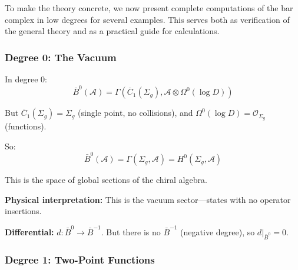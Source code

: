 To make the theory concrete, we now present complete computations of the bar complex in low degrees for several examples. This serves both as verification of the general theory and as a practical guide for calculations.

\subsubsection{Degree 0: The Vacuum}

\begin{computation}[Degree 0]\label{comp:deg0}
In degree 0:
$$\bar{B}^0(\mathcal{A}) = \Gamma\left(\overline{C}_1(\Sigma_g), \mathcal{A} \otimes \Omega^0(\log D)\right)$$

But $\overline{C}_1(\Sigma_g) = \Sigma_g$ (single point, no collisions), and $\Omega^0(\log D) = \mathcal{O}_{\Sigma_g}$ (functions).

So:
$$\bar{B}^0(\mathcal{A}) = \Gamma(\Sigma_g, \mathcal{A}) = H^0(\Sigma_g, \mathcal{A})$$

This is the space of global sections of the chiral algebra.

\textbf{Physical interpretation:} This is the vacuum sector—states with no operator insertions.

\textbf{Differential:} $d: \bar{B}^0 \to \bar{B}^{-1}$. But there is no $\bar{B}^{-1}$ (negative degree), so $d|_{\bar{B}^0} = 0$.
\end{computation}

\subsubsection{Degree 1: Two-Point Functions}

